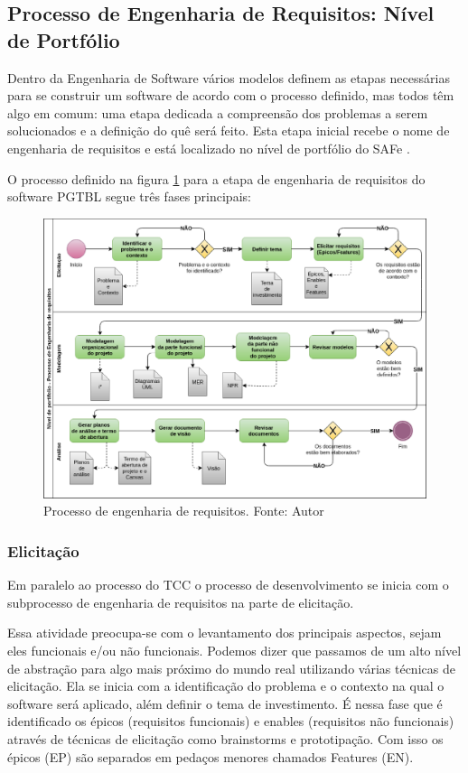 \subsection{Processo de Engenharia de Requisitos: Nível de Portfólio}

Dentro da Engenharia de Software vários modelos definem as etapas necessárias para se construir um software de acordo
com o processo definido, mas todos têm algo em comum: uma etapa dedicada a compreensão dos problemas a serem
solucionados e a definição do quê será feito. Esta etapa inicial recebe o nome de engenharia de requisitos e está
localizado no nível de portfólio do SAFe \cite{pressman}.

O processo definido na figura \ref{fig:requisitos} para a etapa de engenharia de requisitos do software PGTBL segue três fases principais:

\begin{figure}[h!]
	\centering
  \includegraphics[keepaspectratio=true,scale=0.5]{figuras/requisitos.eps}
  \caption[Processo de engenharia de requisitos.]{Processo de engenharia de requisitos. Fonte: Autor}
	\label{fig:requisitos}
\end{figure}

\subsubsection{Elicitação}

Em paralelo ao processo do TCC o processo de desenvolvimento se inicia com o subprocesso de engenharia de requisitos na parte de elicitação.

Essa atividade preocupa-se com o levantamento dos principais aspectos, sejam eles funcionais e/ou não funcionais.  Podemos dizer que passamos de um alto nível de abstração para algo mais próximo do mundo real utilizando várias técnicas de elicitação. Ela se inicia com a identificação do problema e o contexto na qual o software será aplicado, além definir o tema de investimento. É nessa fase que é identificado os épicos (requisitos funcionais) e enables (requisitos não funcionais) através de técnicas de elicitação como brainstorms e prototipação. Com isso os épicos (EP) são separados em pedaços menores chamados Features (EN).

